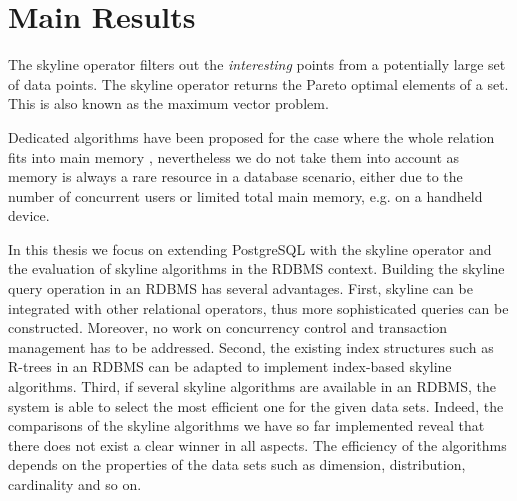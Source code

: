 % 
% 
% 
% 
% 
% 
% 
%


\section{Main Results} 
The skyline operator \citep{Borzsonyi2001} filters out the
\emph{interesting} points from a potentially large set of data
points. The skyline operator returns the Pareto optimal elements of a set. This is also known as the maximum vector
problem.

Dedicated algorithms have been proposed for the case where the whole relation
fits into main memory \citep{Preparata1985}, nevertheless we do not
take them into account as memory is always a rare resource in a
database scenario, either due to the number of concurrent users or
limited total main memory, e.g. on a handheld device.

In this thesis we focus on extending PostgreSQL with the skyline
operator and the evaluation of skyline algorithms in the RDBMS context.
Building the skyline query operation in an RDBMS has
several advantages.  First, skyline can be integrated with other
relational operators, thus more sophisticated queries can be
constructed.  Moreover, no work on concurrency control and transaction
management has to be addressed.  Second, the existing index structures
such as R-trees in an RDBMS can be adapted to implement index-based
skyline algorithms.  Third, if several skyline algorithms are
available in an RDBMS, the system is able to select the most efficient
one for the given data sets.  Indeed, the comparisons of the skyline
algorithms we have so far implemented reveal that there does not exist
a clear winner in all aspects.  The efficiency of the algorithms
depends on the properties of the data sets such as dimension,
distribution, cardinality and so on.

